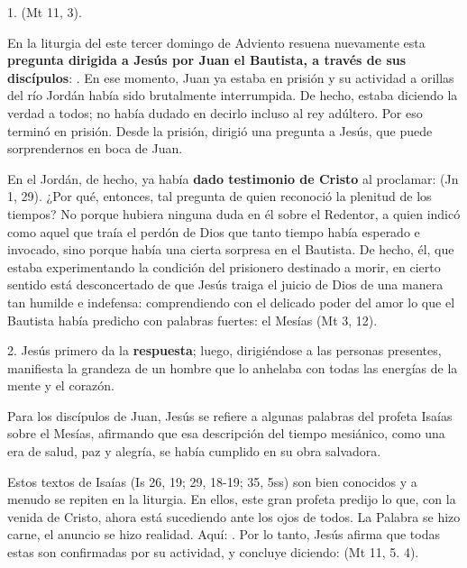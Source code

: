 				\begin{body}
					1.  (Mt 11, 3).
					
					En la liturgia del este tercer domingo de Adviento resuena nuevamente esta \textbf{pregunta dirigida a Jesús por Juan el Bautista, a través de sus discípulos}: . En ese momento, Juan ya estaba en prisión y su actividad a orillas del río Jordán había sido brutalmente interrumpida. De hecho, estaba diciendo la verdad a todos; no había dudado en decirlo incluso al rey adúltero. Por eso terminó en prisión. Desde la prisión, dirigió una pregunta a Jesús, que puede sorprendernos en boca de Juan.
					
					En el Jordán, de hecho, ya había \textbf{dado testimonio de Cristo} al proclamar:  (Jn 1, 29). ¿Por qué, entonces, tal pregunta de quien reconoció la plenitud de los tiempos? No porque hubiera ninguna duda en él sobre el Redentor, a quien indicó como aquel que traía el perdón de Dios que tanto tiempo había esperado e invocado, sino porque había una cierta sorpresa en el Bautista. De hecho, él, que estaba experimentando la condición del prisionero destinado a morir, en cierto sentido está desconcertado de que Jesús traiga el juicio de Dios de una manera tan humilde e indefensa: comprendiendo con el delicado poder del amor lo que el Bautista había predicho con palabras fuertes: el Mesías  (Mt 3, 12).
					
					2. Jesús primero da la \textbf{respuesta}; luego, dirigiéndose a las personas presentes, manifiesta la grandeza de un hombre que lo anhelaba con todas las energías de la mente y el corazón.
					
					Para los discípulos de Juan, Jesús se refiere a algunas palabras del profeta Isaías sobre el Mesías, afirmando que esa descripción del tiempo mesiánico, como una era de salud, paz y alegría, se había cumplido en su obra salvadora.
					
					Estos textos de Isaías (Is 26, 19; 29, 18-19; 35, 5ss) son bien conocidos y a menudo se repiten en la liturgia. En ellos, este gran profeta predijo lo que, con la venida de Cristo, ahora está sucediendo ante los ojos de todos. La Palabra se hizo carne, el anuncio se hizo realidad. Aquí: . Por lo tanto, Jesús afirma que todas estas  son confirmadas por su actividad, y concluye diciendo:  (Mt 11, 5. 4).
					

\end{body}
